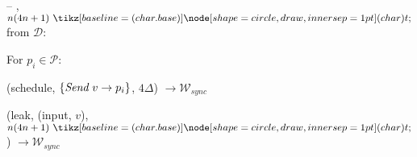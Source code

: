 \begin{bbox}[title={$\F_{\msf{bcast}} (\mathcal{D}, \mathcal{P}=p_1,...,p_n)$}]

-- \OnInput {}, $n(4n+1) \token$ from $\mathcal{D}$:

	\qquad For $p_i \in \mathcal{P}$:
		
		\qqquad \Send (schedule, $\{\emph{Send}~ v \rightarrow p_i\}$, $4 \Delta$) $\rightarrow \mathcal{W}_{sync}$

	\qquad \Send (leak, (input, $v$), $n(4n+1) \token$) $\rightarrow \mathcal{W}_{sync}$

\end{bbox}
